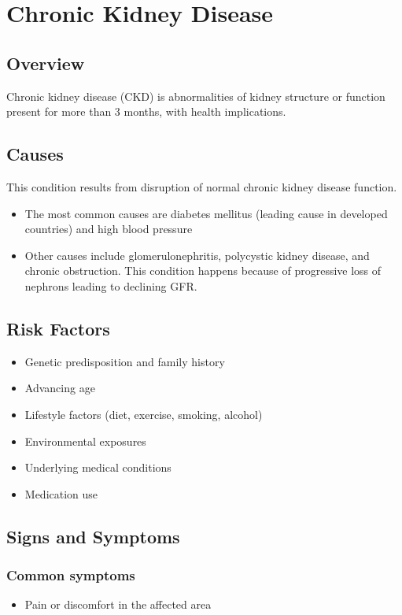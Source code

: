 \chapter{Chronic Kidney Disease}
\label{sec:Chronic Kidney Disease}

\section{Overview}
Chronic kidney disease (CKD) is abnormalities of kidney structure or function present for more than 3 months, with health implications.
\section{Causes}
This condition results from disruption of normal chronic kidney disease function.

\begin{itemize}[noitemsep]
  \item The most common causes are diabetes mellitus (leading cause in developed countries) and high blood pressure
  \item Other causes include glomerulonephritis, polycystic kidney disease, and chronic obstruction. This condition happens because of progressive loss of nephrons leading to declining GFR.
\end{itemize}
\section{Risk Factors}


\begin{itemize}[noitemsep]
  \item Genetic predisposition and family history
  \item Advancing age
  \item Lifestyle factors (diet, exercise, smoking, alcohol)
  \item Environmental exposures
  \item Underlying medical conditions
  \item Medication use
\end{itemize}
\section{Signs and Symptoms}

\subsection{Common symptoms}
\begin{itemize}[noitemsep]
  \item Pain or discomfort in the affected area
  \end{itemize}


